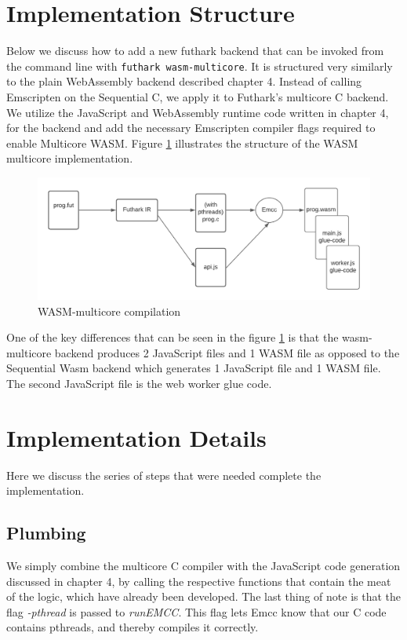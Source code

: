 \documentclass[11pt]{book}
\begin{document}
\section{Implementation Structure}

Below we discuss how to add a new futhark backend that can be invoked from the command line with \texttt{futhark wasm-multicore}. It is structured very similarly to the plain WebAssembly backend described chapter 4. Instead of calling Emscripten on the Sequential C, we apply it to Futhark's multicore C backend. We utilize the JavaScript and WebAssembly runtime code written in chapter 4, for the backend and add the necessary Emscripten compiler flags required to enable Multicore WASM. Figure \ref{fig:wasm-mc} illustrates the structure of the WASM multicore implementation.

\begin{figure}[htbp]
\centerline{\includegraphics[width=\textwidth]{figures/WASM_MC_compiler.png}}
    \caption{WASM-multicore compilation}
\label{fig:wasm-mc}
\end{figure}
One of the key differences that can be seen in the figure \ref{fig:wasm-mc} is that the wasm-multicore backend produces 2 JavaScript files and 1 WASM file as opposed to the Sequential Wasm backend which generates 1 JavaScript file and 1 WASM file. The second JavaScript file is the web worker glue code.

\section{Implementation Details}
Here we discuss the series of steps that were needed complete the implementation.
\subsection{Plumbing}

We simply combine the multicore C compiler with the JavaScript code generation discussed in chapter 4, by calling the respective functions that contain the meat of the logic, which have already been developed. The last thing of note is that the flag \textit{-pthread} is passed to \textit{runEMCC}. This flag lets Emcc know that our C code contains pthreads, and thereby compiles it correctly.
\end{document}
